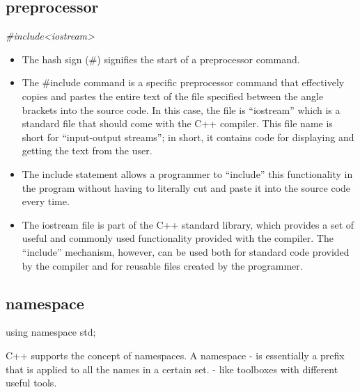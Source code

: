 \documentclass[
]{article}
\newenvironment{Shaded}{\begin{snugshade}}{\end{snugshade}}
\newcommand{\CommentTok}[1]{\textcolor[rgb]{0.56,0.35,0.01}{\textit{#1}}}
\newcommand{\NormalTok}[1]{#1}
\begin{document}
\subsection{preprocessor}\label{preprocessor}

\begin{Shaded}
\begin{Highlighting}[]
\CommentTok{\#include\textless{}iostream\textgreater{}}
\end{Highlighting}
\end{Shaded}

\begin{itemize}
\item
  The hash sign (\#) signifies the start of a preprocessor command.
\item
  The \#include command is a specific preprocessor command that
  effectively copies and pastes the entire text of the file specified
  between the angle brackets into the source code. In this case, the
  file is ``iostream'' which is a standard file that should come with
  the C++ compiler. This file name is short for ``input-output
  streams''; in short, it contains code for displaying and getting the
  text from the user.
\item
  The include statement allows a programmer to ``include'' this
  functionality in the program without having to literally cut and paste
  it into the source code every time.
\item
  The iostream file is part of the C++ standard library, which provides
  a set of useful and commonly used functionality provided with the
  compiler. The ``include'' mechanism, however, can be used both for
  standard code provided by the compiler and for reusable files created
  by the programmer.
\end{itemize}

\subsection{namespace}\label{namespace}

\begin{Shaded}
\begin{Highlighting}[]
\NormalTok{using namespace std;}
\end{Highlighting}
\end{Shaded}

C++ supports the concept of namespaces. A namespace - is essentially a
prefix that is applied to all the names in a certain set. - like
toolboxes with different useful tools.
\end{document}
